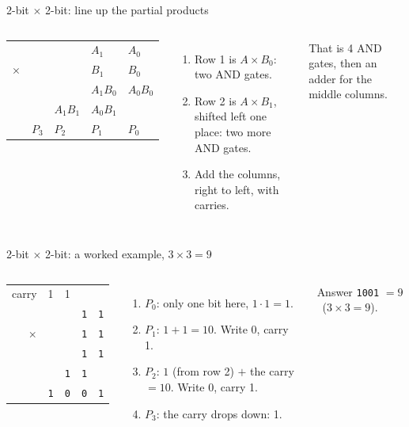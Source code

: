 \documentclass[aspectratio=169,10pt]{beamer}
\newcommand{\gc}[1]{\textcolor{black!60}{\footnotesize #1}}
\begin{document}
\begin{frame}{2-bit $\times$ 2-bit: line up the partial products}
\begin{columns}[c]
\begin{center}{\Large
\begin{tabular}{@{}r>{\centering\arraybackslash}p{1.3cm}>{\centering\arraybackslash}p{1.3cm}>{\centering\arraybackslash}p{1.3cm}>{\centering\arraybackslash}p{1.3cm}@{}}
 & & & $A_1$ & $A_0$\\
$\times$ & & & $B_1$ & $B_0$\\\hline
 & & & $A_1B_0$ & $A_0B_0$\\
 & & $A_1B_1$ & $A_0B_1$ & \\\hline
 & $P_3$ & $P_2$ & $P_1$ & $P_0$
\end{tabular}}
\end{center}
\begin{enumerate}
\item Row 1 is $A\times B_0$: two AND gates.
\item Row 2 is $A\times B_1$, shifted left one place: two more AND gates.
\item Add the columns, right to left, with carries.
\end{enumerate}
That is 4 AND gates, then an adder for the middle columns.
\end{columns}
\end{frame}

\begin{frame}{2-bit $\times$ 2-bit: a worked example, $3\times3=9$}
\begin{columns}[c]
\begin{center}{\huge
\begin{tabular}{@{}r>{\centering\arraybackslash}p{0.9cm}>{\centering\arraybackslash}p{0.9cm}>{\centering\arraybackslash}p{0.9cm}>{\centering\arraybackslash}p{0.9cm}@{}}
\gc{carry} & \gc{1} & \gc{1} & & \\
 & & & \texttt{1} & \texttt{1}\\
$\times$ & & & \texttt{1} & \texttt{1}\\\hline
 & & & \texttt{1} & \texttt{1}\\
 & & \texttt{1} & \texttt{1} & \\\hline
 & \texttt{1} & \texttt{0} & \texttt{0} & \texttt{1}
\end{tabular}}
\end{center}
\begin{enumerate}
\item $P_0$: only one bit here, $1\cdot1=1$.
\item $P_1$: $1+1=10$. Write 0, carry 1.
\item $P_2$: $1$ (from row 2) $+$ the carry $=10$. Write 0, carry 1.
\item $P_3$: the carry drops down: 1.
\end{enumerate}
Answer \texttt{1001} $=9$ \ ($3\times3=9$).
\end{columns}
\end{frame}
\end{document}
